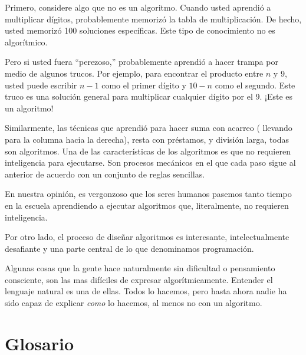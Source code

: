 Primero, considere algo que no es un algoritmo. Cuando usted aprendió 
a multiplicar dígitos, probablemente memorizó la tabla de multiplicación.
De hecho, usted memorizó 100 soluciones específicas. Este tipo de conocimiento
no es algorítmico.

Pero si usted fuera ``perezoso,'' probablemente aprendió a hacer trampa
por medio de algunos trucos. Por ejemplo, para encontrar el producto entre
$n$ y 9, usted puede escribir  $n-1$ como el primer dígito y $10-n$ como el 
segundo. Este truco es una solución general para multiplicar cualquier 
dígito por el 9. ¡Este es un algoritmo!

Similarmente, las técnicas que aprendió para hacer suma con acarreo ( 
llevando para la columna hacia la derecha), resta con préstamos, y 
división larga, todas son algoritmos. Una de las características
de los algoritmos es que no requieren inteligencia para ejecutarse.
Son procesos mecánicos en el que cada paso sigue al anterior
de acuerdo con un conjunto de reglas sencillas.

En nuestra opinión, es vergonzoso que los seres humanos pasemos
tanto tiempo en la escuela aprendiendo a ejecutar algoritmos que, 
literalmente, no requieren inteligencia.

Por otro lado, el proceso de diseñar algoritmos es interesante,
intelectualmente desafiante y una parte central de lo que 
denominamos programación.

Algunas cosas que la gente hace naturalmente sin dificultad o 
pensamiento consciente, son las mas difíciles de expresar algorítmicamente.
Entender el lenguaje natural es una de ellas. Todos lo hacemos, pero
hasta ahora nadie ha sido capaz de explicar {\em como} lo hacemos, al menos
no con un algoritmo.


\section{Glosario}

